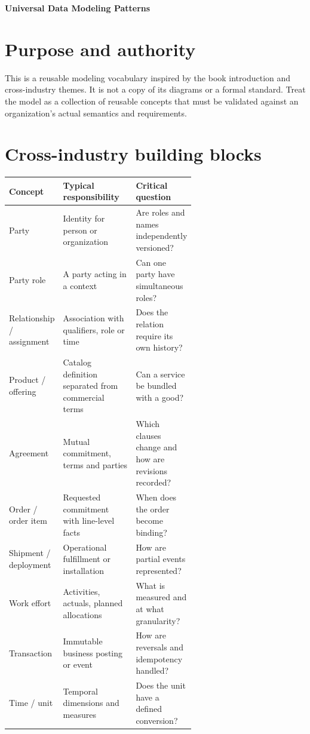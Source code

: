 \documentclass[11pt,letterpaper]{article}
\begin{document}
\begin{center}
{\LARGE\bfseries\color{navy} Universal Data Modeling Patterns}\par
\vspace{0.25em}{\large Conceptual, logical and physical modeling}\par
{}
\end{center}
\vspace{0.8em}
\section{Purpose and authority}
This is a reusable modeling vocabulary inspired by the book introduction and cross-industry themes. It is not a copy of its diagrams or a formal standard. Treat the model as a collection of reusable concepts that must be validated against an organization's actual semantics and requirements.


\section{Cross-industry building blocks}
\begin{tabularx}{\linewidth}{@{}>{\raggedright\arraybackslash}p{0.23\linewidth} >{\raggedright\arraybackslash}p{0.39\linewidth}>{\raggedright\arraybackslash}X@{}}
\toprule
\textbf{Concept} & \textbf{Typical responsibility} & \textbf{Critical question} \\ 
\midrule
Party & Identity for person or organization & Are roles and names independently versioned? \\ 
Party role & A party acting in a context & Can one party have simultaneous roles? \\ 
Relationship / assignment & Association with qualifiers, role or time & Does the relation require its own history? \\ 
Product / offering & Catalog definition separated from commercial terms & Can a service be bundled with a good? \\ 
Agreement & Mutual commitment, terms and parties & Which clauses change and how are revisions recorded? \\ 
Order / order item & Requested commitment with line-level facts & When does the order become binding? \\ 
Shipment / deployment & Operational fulfillment or installation & How are partial events represented? \\ 
Work effort & Activities, actuals, planned allocations & What is measured and at what granularity? \\ 
Transaction & Immutable business posting or event & How are reversals and idempotency handled? \\ 
Time / unit & Temporal dimensions and measures & Does the unit have a defined conversion? \\ 
\bottomrule
\end{tabularx}
\end{document}
